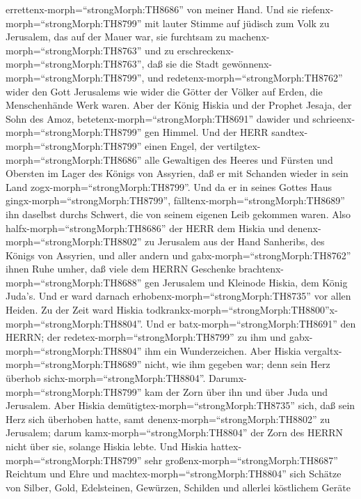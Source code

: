 errettenx-morph=``strongMorph:TH8686'' von meiner Hand. 
Und sie riefenx-morph=``strongMorph:TH8799'' mit lauter Stimme auf
jüdisch zum Volk zu Jerusalem, das auf der Mauer war, sie furchtsam zu
machenx-morph=``strongMorph:TH8763'' und zu
erschreckenx-morph=``strongMorph:TH8763'', daß sie die Stadt
gewönnenx-morph=``strongMorph:TH8799'',  und
redetenx-morph=``strongMorph:TH8762'' wider den Gott Jerusalems wie
wider die Götter der Völker auf Erden, die Menschenhände Werk waren.
 Aber der König Hiskia und der Prophet Jesaja, der Sohn des
Amoz, betetenx-morph=``strongMorph:TH8691'' dawider und
schrieenx-morph=``strongMorph:TH8799'' gen Himmel.  Und der
HERR sandtex-morph=``strongMorph:TH8799'' einen Engel, der
vertilgtex-morph=``strongMorph:TH8686'' alle Gewaltigen des Heeres und
Fürsten und Obersten im Lager des Königs von Assyrien, daß er mit
Schanden wieder in sein Land zogx-morph=``strongMorph:TH8799''. Und da
er in seines Gottes Haus gingx-morph=``strongMorph:TH8799'',
fälltenx-morph=``strongMorph:TH8689'' ihn daselbst durchs Schwert, die
von seinem eigenen Leib gekommen waren.  Also
halfx-morph=``strongMorph:TH8686'' der HERR dem Hiskia und
denenx-morph=``strongMorph:TH8802'' zu Jerusalem aus der Hand Sanheribs,
des Königs von Assyrien, und aller andern und
gabx-morph=``strongMorph:TH8762'' ihnen Ruhe umher,  daß
viele dem HERRN Geschenke brachtenx-morph=``strongMorph:TH8688'' gen
Jerusalem und Kleinode Hiskia, dem König Juda's. Und er ward darnach
erhobenx-morph=``strongMorph:TH8735'' vor allen Heiden.  Zu
der Zeit ward Hiskia
todkrankx-morph=``strongMorph:TH8800''x-morph=``strongMorph:TH8804''.
Und er batx-morph=``strongMorph:TH8691'' den HERRN; der
redetex-morph=``strongMorph:TH8799'' zu ihm und
gabx-morph=``strongMorph:TH8804'' ihm ein Wunderzeichen. 
Aber Hiskia vergaltx-morph=``strongMorph:TH8689'' nicht, wie ihm gegeben
war; denn sein Herz überhob sichx-morph=``strongMorph:TH8804''.
Darumx-morph=``strongMorph:TH8799'' kam der Zorn über ihn und über Juda
und Jerusalem.  Aber Hiskia
demütigtex-morph=``strongMorph:TH8735'' sich, daß sein Herz sich
überhoben hatte, samt denenx-morph=``strongMorph:TH8802'' zu Jerusalem;
darum kamx-morph=``strongMorph:TH8804'' der Zorn des HERRN nicht über
sie, solange Hiskia lebte.  Und Hiskia
hattex-morph=``strongMorph:TH8799'' sehr
großenx-morph=``strongMorph:TH8687'' Reichtum und Ehre und
machtex-morph=``strongMorph:TH8804'' sich Schätze von Silber, Gold,
Edelsteinen, Gewürzen, Schilden und allerlei köstlichem Geräte

